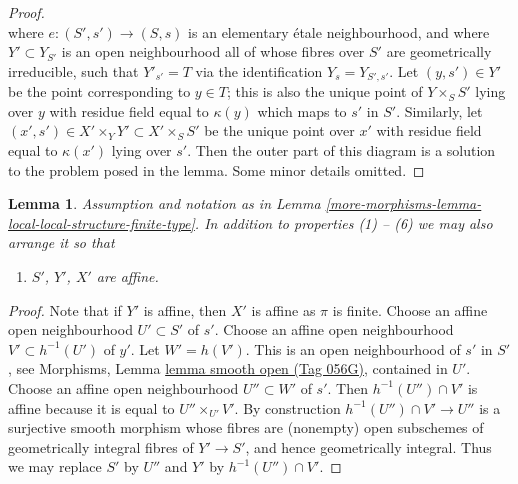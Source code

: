 \documentclass{amsart}
\theoremstyle{plain}
\newtheorem{lemma}[subsection]{Lemma}
\theoremstyle{definition}
\theoremstyle{remark}
\numberwithin{equation}{subsection}
\begin{document}
\begin{proof}
$${}
$$
where $e : (S', s') \to (S, s)$ is an elementary \'etale neighbourhood,
and where $Y' \subset Y_{S'}$ is an open neighbourhood all of whose fibres
over $S'$ are geometrically irreducible, such that $Y'_{s'} = T$ via
the identification $Y_s = Y_{S', s'}$. Let $(y, s') \in Y'$ be the point
corresponding to $y \in T$; this is also the unique point of $Y \times_S S'$
lying over $y$ with residue field equal to $\kappa(y)$ which maps to $s'$
in $S'$. Similarly, let $(x', s') \in X' \times_Y Y' \subset X' \times_S S'$
be the unique point over $x'$ with residue field equal to $\kappa(x')$
lying over $s'$. Then the outer part of this diagram is a solution to the
problem posed in the lemma. Some minor details omitted.
\end{proof}


\begin{lemma}
\label{more-morphisms-lemma-local-local-structure-finite-type-affine}
Assumption and notation as in
Lemma \ref{more-morphisms-lemma-local-local-structure-finite-type}.
In addition to properties (1) -- (6) we may also arrange it so that
\begin{enumerate}
\item[(7)] $S'$, $Y'$, $X'$ are affine.
\end{enumerate}
\end{lemma}

\begin{proof}
Note that if $Y'$ is affine, then $X'$ is affine as $\pi$ is finite.
Choose an affine open neighbourhood $U' \subset S'$ of $s'$.
Choose an affine open neighbourhood $V' \subset h^{-1}(U')$ of $y'$.
Let $W' = h(V')$. This is an open neighbourhood of $s'$ in $S'$, see
Morphisms, Lemma \href{https://stacks.math.columbia.edu/tag/056G}{lemma smooth open (Tag 056G)},
contained in $U'$. Choose an affine open neighbourhood $U'' \subset W'$
of $s'$. Then $h^{-1}(U'') \cap V'$ is affine because it is equal to
$U'' \times_{U'} V'$. By construction
$h^{-1}(U'') \cap V' \to U''$ is a surjective smooth morphism whose
fibres are (nonempty) open subschemes of geometrically integral fibres
of $Y' \to S'$, and hence geometrically integral. Thus we may replace
$S'$ by $U''$ and $Y'$ by $h^{-1}(U'') \cap V'$.
\end{proof}
\end{document}
